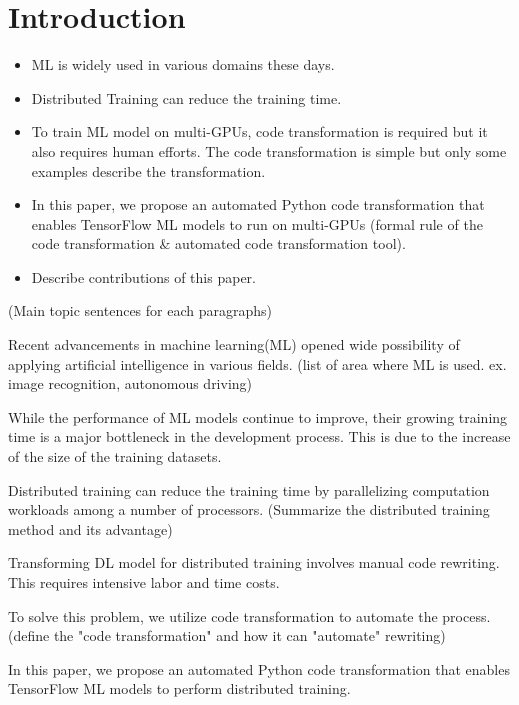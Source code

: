 \section{Introduction}\label{sec:intro}
\begin{itemize}
  \item ML is widely used in various domains these days.
  \item Distributed Training can reduce the training time.
  \item To train ML model on multi-GPUs, code transformation is required but it
    also requires human efforts. The code transformation is simple but only
    some examples describe the transformation.
  \item In this paper, we propose an automated Python code transformation that
    enables TensorFlow ML models to run on multi-GPUs (formal rule of the code
    transformation \& automated code transformation tool).
  \item Describe contributions of this paper.
\end{itemize}

(Main topic sentences for each paragraphs)

Recent advancements in machine learning(ML) opened wide possibility of
applying artificial intelligence in various fields.
(list of area where ML is used. ex. image recognition, autonomous driving)

While the performance of ML models continue to improve,
their growing training time is a major bottleneck in the development process.
This is due to the increase of the size of the training datasets.

Distributed training can reduce the training time 
by parallelizing computation workloads among a number of processors.
(Summarize the distributed training method and its advantage)

Transforming DL model for distributed training involves
manual code rewriting. This requires intensive labor and time costs.

To solve this problem, we utilize code transformation to automate the process.
(define the "code transformation" and how it can "automate" rewriting)

In this paper, we propose an automated Python code transformation that enables
TensorFlow ML models to perform distributed training.


